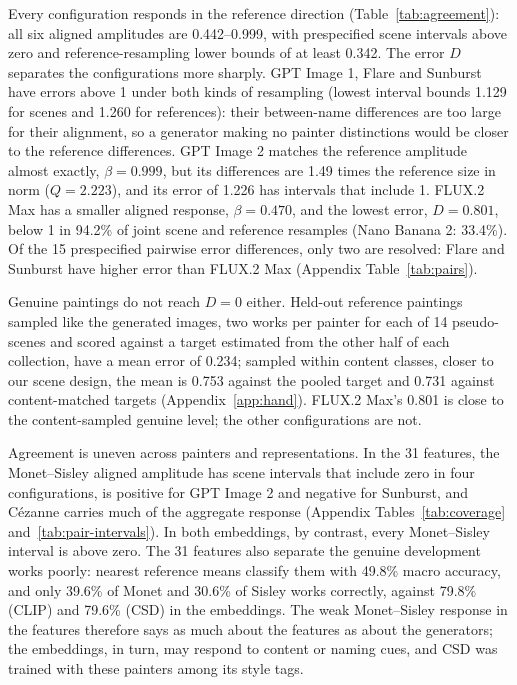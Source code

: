 \documentclass[10pt]{article}
\begin{document}
Every configuration responds in the reference direction (Table~\ref{tab:agreement}): all six
aligned amplitudes are 0.442--0.999, with prespecified scene intervals above zero and
reference-resampling lower bounds of at least 0.342. The error $D$ separates the configurations
more sharply. GPT Image 1, Flare and Sunburst have errors above 1 under both kinds of resampling
(lowest interval bounds 1.129 for scenes and 1.260 for references): their between-name differences
are too large for their alignment, so a generator making no painter distinctions would be closer to
the reference differences. GPT Image 2 matches the reference amplitude almost exactly,
$\beta=0.999$, but its differences are 1.49 times the reference size in norm ($Q=2.223$), and its
error of 1.226 has intervals that include 1. FLUX.2 Max has a smaller aligned response,
$\beta=0.470$, and the lowest error, $D=0.801$, below 1 in 94.2\% of joint scene and reference
resamples (Nano Banana 2: 33.4\%). Of the 15 prespecified pairwise error differences, only two are
resolved: Flare and Sunburst have higher error than FLUX.2 Max (Appendix Table~\ref{tab:pairs}).

Genuine paintings do not reach $D=0$ either. Held-out reference paintings sampled like the
generated images, two works per painter for each of 14 pseudo-scenes and scored against a target
estimated from the other half of each collection, have a mean error of 0.234; sampled within
content classes, closer to our scene design, the mean is 0.753 against the pooled target and 0.731
against content-matched targets (Appendix~\ref{app:hand}). FLUX.2 Max's 0.801 is close to the
content-sampled genuine level; the other configurations are not.

Agreement is uneven across painters and representations. In the 31 features, the Monet--Sisley
aligned amplitude has scene intervals that include zero in four configurations, is positive for
GPT Image 2 and negative for Sunburst, and C\'ezanne carries much of the aggregate response
(Appendix Tables~\ref{tab:coverage} and~\ref{tab:pair-intervals}). In both embeddings, by contrast,
every Monet--Sisley interval is above zero. The 31 features also separate the genuine development
works poorly: nearest reference means classify them with 49.8\% macro accuracy, and only 39.6\% of
Monet and 30.6\% of Sisley works correctly, against 79.8\% (CLIP) and 79.6\% (CSD) in the
embeddings. The weak Monet--Sisley response in the features therefore says as much about the
features as about the generators; the embeddings, in turn, may respond to content or naming cues,
and CSD was trained with these painters among its style tags.
\end{document}
